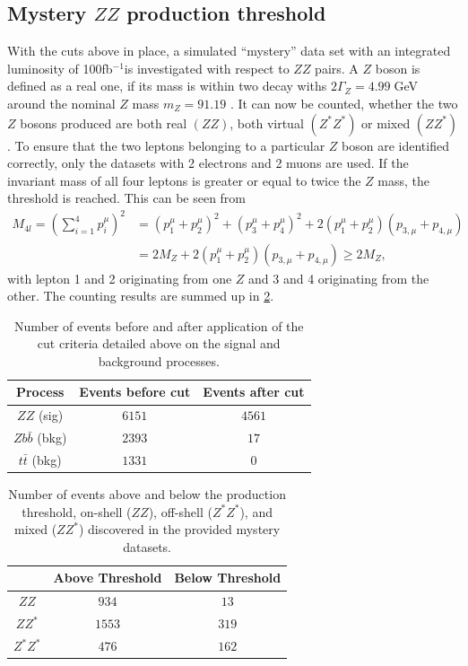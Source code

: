 \documentclass[twoside,        %
               BCOR12mm,       %
               ngerman,english, %
               fleqn,headsepline=false,footsepline=false
              ]{Vorlage/MFPREPORT}
\begin{document}
\subsection{Mystery $ZZ$ production threshold}
With the cuts above in place, a simulated ``mystery'' data set with an
integrated luminosity of 100\;fb$^{-1}$is investigated with respect to $ZZ$
pairs. A $Z$ boson is defined as a real one, if its mass is within two decay
withs $2\Gamma_Z=4.99\;$GeV around the nominal $Z$ mass $m_Z=91.19$
\cite{pdataz}. It can now be counted, whether the two $Z$ bosons produced are
both real $(ZZ)$, both virtual $(Z^*Z^*)$ or mixed $(ZZ^{*})$. To ensure that
the two leptons belonging to a particular $Z$ boson are identified correctly,
only the datasets with 2 electrons and 2 muons are used.
If the invariant mass of all four leptons is greater or equal to twice the $Z$
mass, the threshold is reached. This can be seen from
\begin{align}
    \label{eq:threshhold}
    M_{4l}=(\sum_{i=1}^4p_i^\mu)^2&=(p_1^\mu+p_2^\mu)^2+(p_3^\mu+p_4^\mu)^2+2(p_1^{\mu}+p_2^{\mu})(p_{3,\mu}+p_{4,\mu})\\
    &=2M_Z+2(p_1^{\mu}+p_2^{\mu})(p_{3,\mu}+p_{4,\mu})\geq2M_Z,
\end{align}
with lepton 1 and 2 originating from one $Z$ and 3 and 4 originating from the
other. The counting results are summed up in \cref{tab:ZZcount}.







\begin{table}
\centering
\begin{tabular}{|c|c|c|}
\hline
Process& Events before cut& Events after cut\\
\hline
$ZZ$ (sig)&$6151$&$4561$\\
\hline
$Zb\bar b$ (bkg)& $2393$&$17$\\
\hline
$t\bar t$ (bkg)&$1331$&$0$\\
\hline
\end{tabular}
\caption{Number of events before and after
application of the cut criteria detailed
above on the signal and background
processes.}
\label{tab:cutresults}
\end{table}
\begin{table}
\centering
\begin{tabular}{|c|c|c|}
\hline
& Above Threshold& Below
Threshold\\
\hline
$ZZ$&$934$&$13$\\
\hline
$ZZ^*$& $1553$&$319$\\
\hline
$Z^*Z^*$&$476$&$162$\\
\hline
\end{tabular}
\caption{Number
of events
above and
below the
production
threshold,
on-shell
($ZZ$),
off-shell
($Z^*Z^*$),
and mixed
($ZZ^*$)
discovered in
the provided
mystery
datasets.}
\label{tab:ZZcount}
\end{table}
\end{document}
